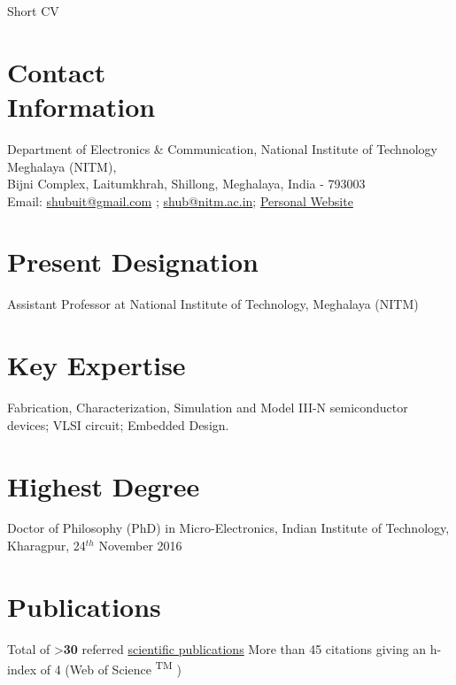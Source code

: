 \documentclass[margin,line,a4paper]{resume}
\begin{document}
{\sc \Large Short CV}
\begin{resume}
     \section{\mysidestyle Contact\\Information}%
 Department of Electronics \& Communication, National Institute of Technology Meghalaya (NITM), \\
     Bijni Complex, Laitumkhrah, Shillong,  Meghalaya, India - 793003 \\
     Email: \href{mailto:shubuit@gmail.com}{shubuit@gmail.com} ; \href{mailto:shub@nitm.ac.in}{shub@nitm.ac.in};  \href{https://sites.google.com/site/shubhankarmajumdar1987/}{ Personal Website } \\
      \section{\mysidestyle Present Designation}
     Assistant Professor at National Institute of Technology, Meghalaya (NITM)
 \section{\mysidestyle Key Expertise } 
 Fabrication, Characterization, Simulation and Model III-N semiconductor devices; VLSI circuit; Embedded Design. 
	
           \section{\mysidestyle Highest Degree}
Doctor of Philosophy (PhD) in Micro-Electronics, Indian Institute of Technology, Kharagpur, 24$ ^{th} $ November 2016

\section{\mysidestyle Publications}
Total of >\textbf{30} referred \href{https://scholar.google.co.in/citations?user=PXDBASwAAAAJ&hl=en}{scientific publications}
 More than 45 citations giving an h-index of 4 (Web of Science \textsuperscript{TM}  )



\end{resume}
\end{document}
